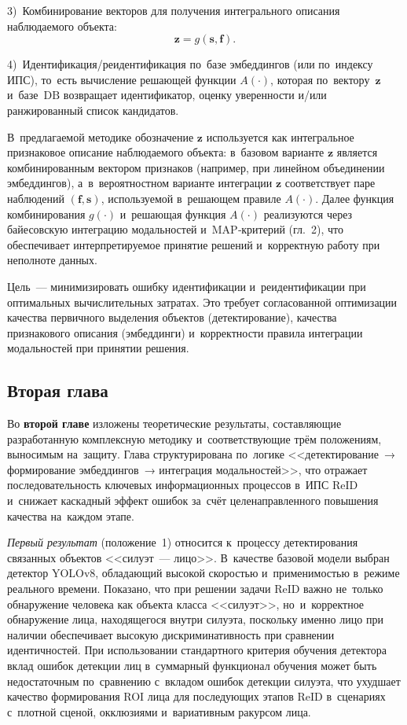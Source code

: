 3)~Комбинирование векторов для получения интегрального описания наблюдаемого
объекта:
\begin{equation}
    \mathbf{z}=g(\mathbf{s},\mathbf{f}).
    \label{eq:combination-step}
\end{equation}

4)~Идентификация/реидентификация по~базе эмбеддингов (или по~индексу ИПС),
то~есть вычисление решающей функции $A(\cdot)$, которая по~вектору~$\mathbf{z}$
и~базе~$\mathrm{DB}$ возвращает идентификатор, оценку уверенности и/или
ранжированный список кандидатов.

В~предлагаемой методике обозначение $\mathbf{z}$ используется как интегральное
признаковое описание наблюдаемого объекта: в~базовом варианте $\mathbf{z}$ является
комбинированным вектором признаков (например, при линейном объединении эмбеддингов),
а~в~вероятностном варианте интеграции $\mathbf{z}$ соответствует паре наблюдений
$(\mathbf{f},\mathbf{s})$, используемой в~решающем правиле $A(\cdot)$.
Далее функция комбинирования $g(\cdot)$ и~решающая функция $A(\cdot)$ реализуются
через байесовскую интеграцию модальностей и~MAP‑критерий (гл.~2), что обеспечивает
интерпретируемое принятие решений и~корректную работу при неполноте данных.

Цель~--- минимизировать ошибку идентификации и~реидентификации при оптимальных
вычислительных затратах. Это требует согласованной оптимизации качества первичного
выделения объектов (детектирование), качества признакового описания (эмбеддинги)
и~корректности правила интеграции модальностей при принятии решения.

\subsection*{Вторая глава}

Во \textbf{второй главе} изложены теоретические результаты, составляющие
разработанную комплексную методику и~соответствующие трём положениям,
выносимым на~защиту. Глава структурирована по~логике
<<детектирование~→ формирование эмбеддингов~→ интеграция модальностей>>,
что отражает последовательность ключевых информационных процессов в~ИПС ReID
и~снижает каскадный эффект ошибок за~счёт целенаправленного повышения качества
на~каждом этапе.

\textit{Первый результат} (положение~1) относится к~процессу детектирования
связанных объектов <<силуэт~--- лицо>>. В~качестве базовой модели выбран
детектор YOLOv8, обладающий высокой скоростью и~применимостью в~режиме
реального времени. Показано, что при решении задачи ReID важно не~только
обнаружение человека как объекта класса <<силуэт>>, но~и~корректное
обнаружение лица, находящегося внутри силуэта, поскольку именно лицо
при наличии обеспечивает высокую дискриминативность при сравнении
идентичностей. При использовании стандартного критерия обучения детектора
вклад ошибок детекции лиц в~суммарный функционал обучения может быть
недостаточным по~сравнению с~вкладом ошибок детекции силуэта, что ухудшает
качество формирования ROI лица для последующих этапов ReID в~сценариях
с~плотной сценой, окклюзиями и~вариативным ракурсом лица.

